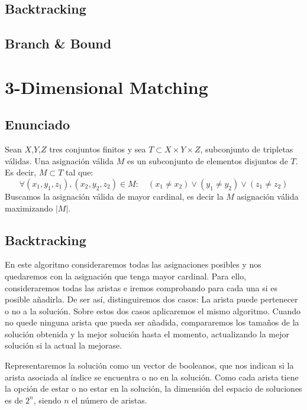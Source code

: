 \documentclass[a4paper, 11pt]{article} %
\begin{document}
  
  \subsection{Backtracking}
  
  \subsection{Branch \& Bound}

\section{3-Dimensional Matching}
  \subsection{Enunciado}
    Sean $X$,$Y$,$Z$ tres conjuntos finitos y sea $T \subset X \times Y \times Z$, subconjunto de tripletas válidas.
    Una asignación válida $M$ es un subconjunto de elementos disjuntos de $T$. Es decir, $M \subset T$ tal que:
    \begin{equation}
     \forall (x_1,y_1,z_1), (x_2,y_2,z_2) \in M : \quad (x_1 \neq x_2) \vee (y_1 \neq y_2) \vee (z_1 \neq z_2)
    \end{equation} 
    Buscamos la asignación válida de mayor cardinal, es decir la $M$ asignación válida maximizando $|M|$.
    
  \subsection{Backtracking}
  En este algoritmo consideraremos todas las asignaciones posibles y nos quedaremos con la asignación que tenga mayor cardinal. Para ello, consideraremos todas las aristas e iremos comprobando para cada una si es posible añadirla. De ser así, distinguiremos dos casos: La arista puede pertenecer o no a la solución. Sobre estos dos casos aplicaremos el mismo algoritmo. Cuando no quede ninguna arista que pueda ser añadida, compararemos los tamaños de la solución obtenida y la mejor solución hasta el momento, actualizando la mejor solución si la actual la mejorase. 
  
  Representaremos la solución como un vector de booleanos, que nos indican si la arista asociada al índice se encuentra o no en la solución. Como cada arista tiene la opción de estar o no estar en la solución, la dimensión del espacio de soluciones es de $2^n$, siendo $n$ el número de aristas. 
\end{document}
